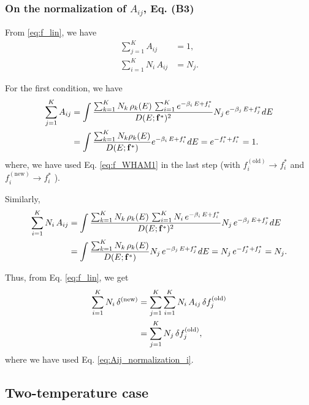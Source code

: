 \documentclass[aip,jcp,preprint,notitlepage, superscriptaddress]{revtex4-1}
\begin{document}
\subsubsection{On the normalization of $A_{ij}$, Eq. (B3)}


From \eqref{eq:f_lin}, we have
%
\begin{align}
  \sum_{j = 1}^K A_{ij}         &= 1,
\label{eq:Aij_normalization_j} \\
  \sum_{i = 1}^K N_i \, A_{ij}  &= N_j.
\label{eq:Aij_normalization_i}
\end{align}



For the first condition, we have
\begin{align}
\sum_{j = 1}^K
A_{ij}
&=
\int
\frac
{
  \sum_{k=1}^K N_k \, \rho_k(E) \,
  \sum_{i = 1}^K e^{-\beta_i \, E + f_i^*}
}
{
  D(E; \mathbf{f}^*)^2
}
N_j \, e^{-\beta_j \, E + f_j^*}
dE
\notag \\
&=
\int
\frac
{
  \sum_{k=1}^K N_k \rho_k(E)
}
{
  D(E; \mathbf{f}^*)
}
e^{-\beta_i \, E + f_i^*}
dE
=
e^{-f_i^* + f_i^*} = 1.
\notag
\end{align}
%
where,
we have used Eq. \eqref{eq:f_WHAM1}
in the last step
(with
$f_i^\mathrm{(old)} \rightarrow f_i^*$
and
$f_i^\mathrm{(new)} \rightarrow f_i^*$
).



Similarly,
\begin{align}
\sum_{i = 1}^K
N_i \, A_{ij}
&=
\int
\frac
{
  \sum_{k=1}^K N_k \, \rho_k(E) \,
  \sum_{i = 1}^K N_i \, e^{-\beta_i \, E + f_i^*}
}
{
  D(E; \mathbf{f}^*)^2
}
N_j \, e^{-\beta_j \, E + f_j^*}
dE
\notag \\
&=
\int
\frac
{
  \sum_{k=1}^K N_k \, \rho_k(E)
}
{
  D(E; \mathbf{f}^*)
}
N_j \, e^{-\beta_j \, E + f_j^*}
dE
=
N_j \, e^{-f_j^* + f_j^*} = N_j.
\notag
\end{align}
%


Thus, from Eq. \eqref{eq:f_lin}, we get
%
\begin{align}
  \sum_{i = 1}^K
    N_i \, \delta^\mathrm{(new)}
&=
  \sum_{j = 1}^K
    \sum_{i = 1}^K
      N_i \, A_{ij}
    \, \delta f_j^\mathrm{(old)} \notag \\
&=
  \sum_{j = 1}^K
    N_j \, \delta f_j^\mathrm{(old)},
  \notag
\end{align}
%
where we have used Eq. \eqref{eq:Aij_normalization_i}.




\subsection{Two-temperature case}
\end{document}
